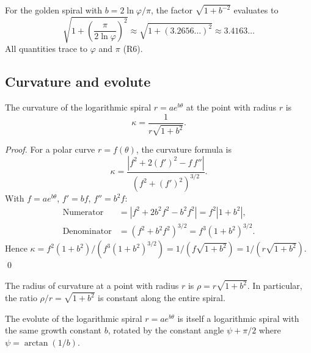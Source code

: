 \begin{remark}
For the golden spiral with \(b = 2\ln\varphi/\pi\), the factor
\(\sqrt{1+b^{-2}}\) evaluates to
\[
  \sqrt{1+\left(\frac{\pi}{2\ln\varphi}\right)^2}
  \approx \sqrt{1 + (3.2656\ldots)^2} \approx 3.4163\ldots
\]
All quantities trace to \(\varphi\) and \(\pi\) (R6).
\end{remark}

\subsection{Curvature and evolute}
\label{subsec:17-curvature}

\begin{proposition}
\label{prop:curvature}
The curvature of the logarithmic spiral \(r = ae^{b\theta}\)
at the point with radius \(r\) is
\begin{equation}\label{eq:curvature}
  \kappa = \frac{1}{r\sqrt{1+b^2}}.
\end{equation}
\end{proposition}

\begin{proof}
For a polar curve \(r = f(\theta)\), the curvature formula is
\[
  \kappa = \frac{|f^2 + 2(f')^2 - f\,f''|}{(f^2+(f')^2)^{3/2}}.
\]
With \(f = ae^{b\theta}\), \(f' = bf\), \(f'' = b^2 f\):
\begin{align*}
  \text{Numerator} &= |f^2 + 2b^2f^2 - b^2f^2| = f^2|1+b^2|,\\
  \text{Denominator} &= (f^2+b^2f^2)^{3/2} = f^3(1+b^2)^{3/2}.
\end{align*}
Hence \(\kappa = f^2(1+b^2)/(f^3(1+b^2)^{3/2})
= 1/(f\sqrt{1+b^2}) = 1/(r\sqrt{1+b^2})\).
\qed
\end{proof}

\begin{corollary}
The radius of curvature at a point with radius \(r\) is
\(\rho = r\sqrt{1+b^2}\).  In particular, the ratio
\(\rho/r = \sqrt{1+b^2}\) is constant along the entire spiral.
\end{corollary}

\begin{proposition}
\label{prop:evolute}
The evolute of the logarithmic spiral \(r = ae^{b\theta}\) is
itself a logarithmic spiral with the same growth constant \(b\),
rotated by the constant angle \(\psi + \pi/2\) where
\(\psi = \arctan(1/b)\).
\end{proposition}

